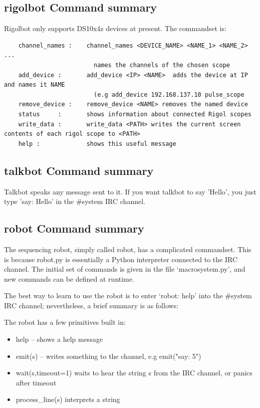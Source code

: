 \subsection{rigolbot Command summary}

Rigolbot only supports DS10x4z devices at present. The commandset is:
\small{
  \begin{verbatim}
    channel_names :    channel_names <DEVICE_NAME> <NAME_1> <NAME_2> ... 
                         names the channels of the chosen scope
    add_device :       add_device <IP> <NAME>  adds the device at IP and names it NAME
                         (e.g add_device 192.168.137.10 pulse_scope
    remove_device :    remove_device <NAME> removes the named device
    status     :       shows information about connected Rigol scopes
    write_data :       write_data <PATH> writes the current screen contents of each rigol scope to <PATH>
    help :             shows this useful message
  \end{verbatim}
}

\subsection{talkbot Command summary}

Talkbot speaks any message sent to it. If you want talkbot to say 'Hello', you just
type 'say: Hello' in the \#system IRC channel.

\subsection{robot Command summary}

The sequencing robot, simply called robot, has a complicated commandset. This is because robot.py is essentially a Python interpreter connected to the IRC channel. The initial set
of commands is given in the file `macrosystem.py', and new commands can be defined at runtime.

The best way to learn to use the robot is to enter `robot: help' into the \#system IRC channel; nevertheless, a brief summary is as follows:

The robot has a few primitives built in:
\begin{itemize}
\item{help  -- shows a help message}
\item{emit(s) -- writes something to the channel, e.g emit("say: 5") }
\item{wait(s,timeout=1) waits to hear the string s from the IRC channel, or panics after timeout}
\item{process\_line(s) interprets a string}
\end{itemize}

